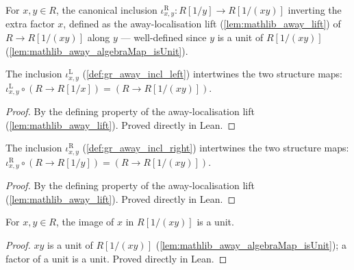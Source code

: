 \begin{definition}

  \label{def:gr_away_incl_right}
  For \(x, y \in R\), the canonical inclusion
  \(\iota^{\mathrm{R}}_{x,y} : R[1/y] \to R[1/(xy)]\) inverting the extra factor
  \(x\), defined as the away-localisation lift (\cref{lem:mathlib_away_lift}) of
  \(R \to R[1/(xy)]\) along \(y\) — well-defined since \(y\) is a unit of
  \(R[1/(xy)]\) (\cref{lem:mathlib_away_algebraMap_isUnit}).
\end{definition}

\begin{lemma}

  \label{lem:gr_awayInclLeft_comp_algebraMap}
  The inclusion \(\iota^{\mathrm{L}}_{x,y}\) (\cref{def:gr_away_incl_left})
  intertwines the two structure maps:
  \(\iota^{\mathrm{L}}_{x,y} \circ (R \to R[1/x]) = (R \to R[1/(xy)])\).
\end{lemma}
\begin{proof}

\leanok
  By the defining property of the away-localisation lift
  (\cref{lem:mathlib_away_lift}). Proved directly in Lean.
\end{proof}

\begin{lemma}

  \label{lem:gr_awayInclRight_comp_algebraMap}
  The inclusion \(\iota^{\mathrm{R}}_{x,y}\) (\cref{def:gr_away_incl_right})
  intertwines the two structure maps:
  \(\iota^{\mathrm{R}}_{x,y} \circ (R \to R[1/y]) = (R \to R[1/(xy)])\).
\end{lemma}
\begin{proof}

\leanok
  By the defining property of the away-localisation lift
  (\cref{lem:mathlib_away_lift}). Proved directly in Lean.
\end{proof}

\begin{lemma}

  \label{lem:gr_isUnit_algebraMap_away_left}
  For \(x, y \in R\), the image of \(x\) in \(R[1/(xy)]\) is a unit.
\end{lemma}
\begin{proof}

\leanok
  \(xy\) is a unit of \(R[1/(xy)]\)
  (\cref{lem:mathlib_away_algebraMap_isUnit}); a factor of a unit is a unit.
  Proved directly in Lean.
\end{proof}

